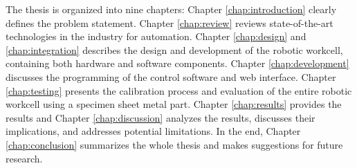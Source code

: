 The thesis is organized into nine chapters: Chapter \ref{chap:introduction} clearly defines the 
problem statement. Chapter \ref{chap:review} reviews state-of-the-art technologies in the
industry for automation. Chapter \ref{chap:design} and \ref{chap:integration} describes the design and development
of the robotic workcell, containing both hardware and software components.
Chapter \ref{chap:development} discusses the 
programming of the control software and web interface. Chapter \ref{chap:testing} 
presents the calibration process and evaluation of the entire
robotic workcell using a specimen sheet metal part. Chapter \ref{chap:results} provides the results and Chapter \ref{chap:discussion} analyzes the results, discusses 
their implications, and addresses potential limitations. In the end, Chapter \ref{chap:conclusion}
summarizes the whole thesis and makes suggestions for
future research.